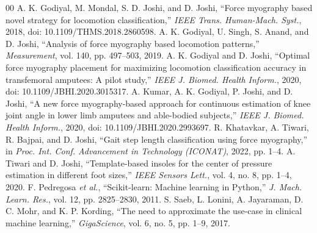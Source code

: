 \documentclass[conference]{IEEEtran}
\begin{document}
\begin{thebibliography}{00}
 A. K. Godiyal, M. Mondal, S. D. Joshi, and D. Joshi, ``Force myography based novel strategy for locomotion classification,'' \emph{IEEE Trans. Human-Mach. Syst.}, 2018, doi: 10.1109/THMS.2018.2860598.
 A. K. Godiyal, U. Singh, S. Anand, and D. Joshi, ``Analysis of force myography based locomotion patterns,'' \emph{Measurement}, vol. 140, pp. 497--503, 2019.
 A. K. Godiyal and D. Joshi, ``Optimal force myography placement for maximizing locomotion classification accuracy in transfemoral amputees: A pilot study,'' \emph{IEEE J. Biomed. Health Inform.}, 2020, doi: 10.1109/JBHI.2020.3015317.
 A. Kumar, A. K. Godiyal, P. Joshi, and D. Joshi, ``A new force myography-based approach for continuous estimation of knee joint angle in lower limb amputees and able-bodied subjects,'' \emph{IEEE J. Biomed. Health Inform.}, 2020, doi: 10.1109/JBHI.2020.2993697.
 R. Khatavkar, A. Tiwari, R. Bajpai, and D. Joshi, ``Gait step length classification using force myography,'' in \emph{Proc. Int. Conf. Advancement in Technology (ICONAT)}, 2022, pp. 1--4.
 A. Tiwari and D. Joshi, ``Template-based insoles for the center of pressure estimation in different foot sizes,'' \emph{IEEE Sensors Lett.}, vol. 4, no. 8, pp. 1--4, 2020.
 F. Pedregosa \emph{et al.}, ``Scikit-learn: Machine learning in Python,'' \emph{J. Mach. Learn. Res.}, vol. 12, pp. 2825--2830, 2011.
 S. Saeb, L. Lonini, A. Jayaraman, D. C. Mohr, and K. P. Kording, ``The need to approximate the use-case in clinical machine learning,'' \emph{GigaScience}, vol. 6, no. 5, pp. 1--9, 2017.
\end{thebibliography}
\end{document}
